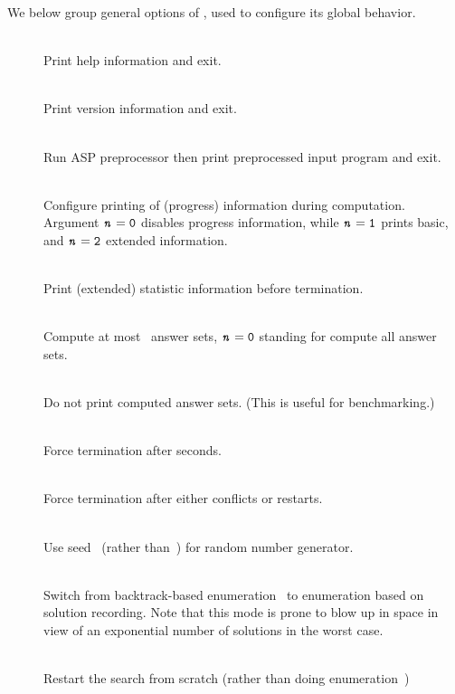 We below group general options of \clasp,
used to configure its global behavior.
%
\begin{description}
\item[]~\\
Print help information and exit.
\item[]~\\
Print version information and exit.
\item[]~\\
Run ASP preprocessor then print preprocessed input program and exit.
\item[]~\\
Configure printing of (progress) information during computation. 
Argument $\texttt{\textit{n}}=\texttt{0}$ disables progress information, while
$\texttt{\textit{n}}=\texttt{1}$ prints basic, and $\texttt{\textit{n}}=\texttt{2}$
extended information.
\item[]~\\
Print (extended) statistic information before termination.
\item[]~\\
Compute at most~ answer sets,
$\texttt{\textit{n}}=\texttt{0}$ standing for compute all answer sets.
\item[]~\\
Do not print computed answer sets.
(This is useful for benchmarking.)
\item[]~\\
Force termination after  seconds.
\item[]~\\
Force termination after either  
conflicts or  restarts.
\item[]~\\
Use seed~ (rather than~) for random number generator.
\item[]~\\
Switch from backtrack-based enumeration~\cite{gekanesc07c} to
enumeration based on solution recording. 
Note that this  mode is prone to blow up 
in space in view of an exponential number of solutions in the worst case.
\item[]~\\
Restart the search from scratch (rather than doing enumeration~\cite{gekanesc07c})

\end{description}
